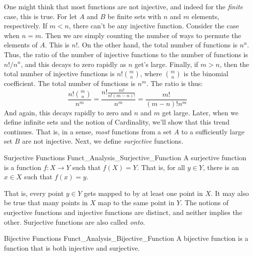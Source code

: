             One might think that most functions are not injective,
            and indeed for the \textit{finite} case, this is true.
            For let $A$ and $B$ be finite sets with $n$ and $m$
            elements, respectively. If $m<n$, there can't be
            any injective function. Consider the case when $n=m$.
            Then we are simply counting the number of ways to
            permute the elements of $A$. This is $n!$. On the
            other hand, the total number of functions is
            $n^{n}$. Thus, the ratio of the number of injective
            functions to the number of functions is
            $n!/n^{n}$, and this decays to zero rapidly as
            $n$ get's large. Finally, if $m>n$, then the total
            number of injective functions is
            $n!\binom{m}{n}$, where $\binom{m}{n}$ is the
            binomial coefficient. The total number of functions
            is $n^{m}$. The ratio is thus:
            \begin{equation}
                \frac{n!\binom{m}{n}}{n^{m}}=
                \frac{n!\frac{m!}{n!(m-n)!}}{n^{m}}
                =\frac{m!}{(m-n)!n^{m}}
            \end{equation}
            And again, this decays rapidly to zero and $n$ and $m$
            get large. Later, when we define infinite sets
            and the notion of Cardinality, we'll show that this
            trend continues. That is, in a sense, \textit{most}
            functions from a set $A$ to a sufficiently large set
            $B$ are not injective. Next, we define
            \textit{surjective} functions.
            \begin{ldefinition}{Surjective Functions}
                  {Funct_Analysis_Surjective_Function}
                A \gls{surjective function} is a function
                $f:X\rightarrow{Y}$ such that $f(X)=Y$.
                That is, for all $y\in{Y}$, there is an
                $x\in{X}$ such that $f(x)=y$.
            \end{ldefinition}
            That is, every point $y\in{Y}$ gets mapped to by
            at least one point in $X$. It may also be true that
            many points in $X$ map to the same point in $Y$.
            The notions of surjective functions and injective
            functions are distinct, and neither implies the
            other. Surjective functions are also called
            \textit{onto}.
            \begin{ldefinition}{Bijective Functions}
                  {Funct_Analysis_Bijective_Function}
                A \gls{bijective function} is a function
                that is both injective and surjective.
            \end{ldefinition}
